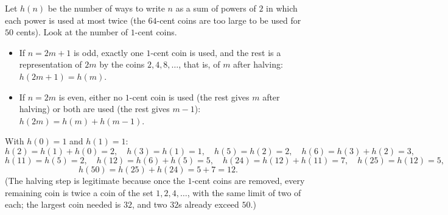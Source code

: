 Let $h(n)$ be the number of ways to write $n$ as a sum of powers of $2$ in which each power is used at most twice (the $64$-cent coins are too large to be used for $50$ cents). Look at the number of $1$-cent coins.
\begin{itemize}
\item If $n=2m+1$ is odd, exactly one $1$-cent coin is used, and the rest is a representation of $2m$ by the coins $2,4,8,\dots$, that is, of $m$ after halving: $h(2m+1)=h(m)$.
\item If $n=2m$ is even, either no $1$-cent coin is used (the rest gives $m$ after halving) or both are used (the rest gives $m-1$): $h(2m)=h(m)+h(m-1)$.
\end{itemize}
With $h(0)=1$ and $h(1)=1$:
\[
h(2)=h(1)+h(0)=2,\quad h(3)=h(1)=1,\quad h(5)=h(2)=2,\quad h(6)=h(3)+h(2)=3,
\]
\[
h(11)=h(5)=2,\quad h(12)=h(6)+h(5)=5,\quad h(24)=h(12)+h(11)=7,\quad h(25)=h(12)=5,
\]
\[
h(50)=h(25)+h(24)=5+7=\boxed{12}.
\]
(The halving step is legitimate because once the $1$-cent coins are removed, every remaining coin is twice a coin of the set $1,2,4,\dots$, with the same limit of two of each; the largest coin needed is $32$, and two $32$s already exceed $50$.)
